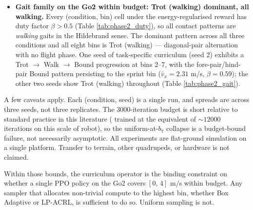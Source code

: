 \begin{itemize}
  \item \textbf{Gait family on the Go2 within budget: Trot (walking) dominant, all walking.} Every (condition, bin) cell under the energy-regularised reward has duty factor $\beta > 0.5$ (Table \ref{tab:phase2_duty}), so all contact patterns are \textit{walking} gaits in the Hildebrand sense. The dominant pattern across all three conditions and all eight bins is Trot (walking) --- diagonal-pair alternation with no flight phase. One seed of task-specific curriculum (seed 2) exhibits a Trot $\to$ Walk $\to$ Bound progression at bins 2--7, with the fore-pair/hind-pair Bound pattern persisting to the sprint bin ($\bar v_x = 2.31$ m/s, $\beta = 0.59$); the other two seeds show Trot (walking) throughout (Table \ref{tab:phase2_gait}).
\end{itemize}

A few caveats apply. Each (condition, seed) is a single run, and spreads are across three seeds, not three replicates. The 3000-iteration budget is short relative to standard practice in this literature (\cite{margolis2022} trained at the equivalent of $\sim 12000$ iterations on this scale of robot), so the uniform-at-$b_7$ collapse is a budget-bound failure, not necessarily asymptotic. All experiments are flat-ground simulation on a single platform. Transfer to terrain, other quadrupeds, or hardware is not claimed.

Within those bounds, the curriculum operator is the binding constraint on whether a single PPO policy on the Go2 covers $[0,\,4]$ m/s within budget. Any sampler that allocates non-trivial compute to the highest bin, whether Box Adaptive or LP-ACRL, is sufficient to do so. Uniform sampling is not.

